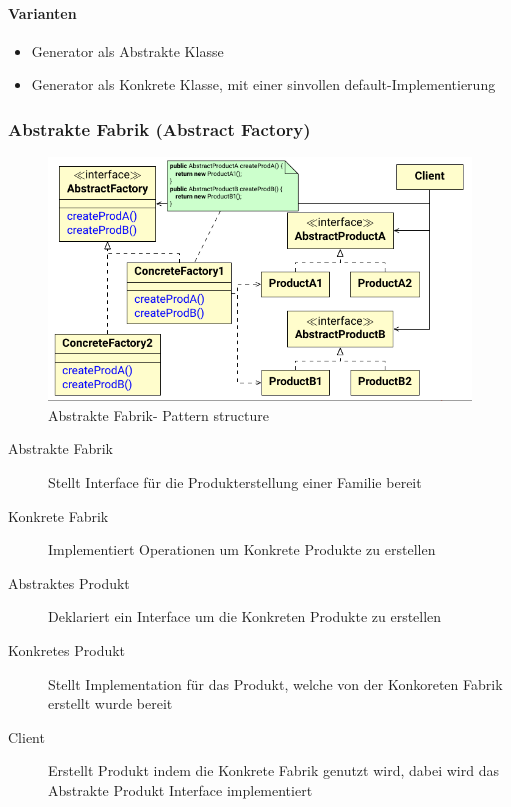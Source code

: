 \documentclass[
    ngerman,
    color=3b,
    summary,
    boxarc,
    main,
]{rubos-tuda-template}
\begin{document}
\paragraph{Varianten}
\begin{itemize}
    \item Generator als Abstrakte Klasse
    \item Generator als Konkrete Klasse, mit einer sinvollen default-Implementierung
\end{itemize}
\clearpage
\subsubsection{Abstrakte Fabrik (Abstract Factory)}
\begin{figure}[ht]
    \centering
    \includegraphics[width=.7\textwidth]{bilder/SE_08_DesignPatterns-seiten-37_cropped.pdf}
    \caption{Abstrakte Fabrik- Pattern structure}
\end{figure}
\FloatBarrier
\begin{description}
    \item[Abstrakte Fabrik] Stellt Interface für die Produkterstellung einer Familie bereit
    \item[Konkrete Fabrik] Implementiert Operationen um Konkrete Produkte zu erstellen
    \item[Abstraktes Produkt] Deklariert ein Interface um die Konkreten Produkte zu erstellen
    \item[Konkretes Produkt] Stellt Implementation für das Produkt, welche von der Konkoreten Fabrik erstellt wurde bereit
    \item[Client] Erstellt Produkt indem die Konkrete Fabrik genutzt wird, dabei wird das Abstrakte Produkt Interface implementiert
\end{description}
\end{document}
